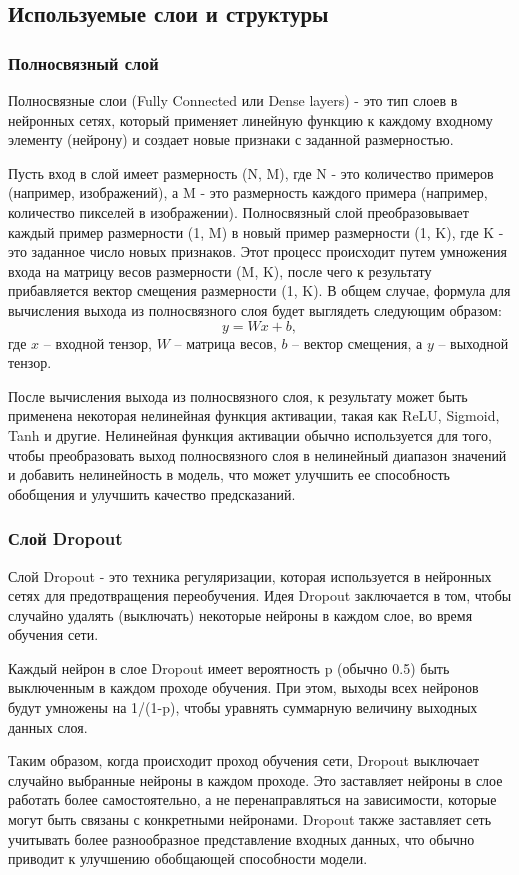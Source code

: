\documentclass[14pt,a4paper]{extarticle}
\begin{document}
\newpage
\subsection{Используемые слои и структуры}
\subsubsection*{Полносвязный слой}
Полносвязные слои (Fully Connected или Dense layers) - это тип слоев в нейронных сетях, который применяет линейную функцию к каждому входному элементу (нейрону) и создает новые признаки с заданной размерностью.

Пусть вход в слой имеет размерность (N, M), где N - это количество примеров (например, изображений), а M - это размерность каждого примера (например, количество пикселей в изображении). Полносвязный слой преобразовывает каждый пример размерности (1, M) в новый пример размерности (1, K), где K - это заданное число новых признаков. Этот процесс происходит путем умножения входа на матрицу весов размерности (M, K), после чего к результату прибавляется вектор смещения размерности (1, K). В общем случае, формула для вычисления выхода из полносвязного слоя будет выглядеть следующим образом:
$$y = Wx + b,$$
где $x$ -- входной тензор, $W$ -- матрица весов, $b$ -- вектор смещения, а $y$ -- вы\-ход\-ной тензор.

После вычисления выхода из полносвязного слоя, к результату может быть применена некоторая нелинейная функция активации, такая как ReLU, Sigmoid, Tanh и другие. Нелинейная функция активации обычно используется для того, чтобы преобразовать выход полносвязного слоя в нелинейный диапазон значений и добавить нелинейность в модель, что может улучшить ее способность обобщения и улучшить качество предсказаний.

\subsubsection*{Слой Dropout}
Слой Dropout - это техника регуляризации, которая используется в нейронных сетях для предотвращения переобучения. Идея Dropout заключается в том, чтобы случайно удалять (выключать) некоторые нейроны в каждом слое, во время обучения сети.

Каждый нейрон в слое Dropout имеет вероятность p (обычно 0.5) быть выключенным в каждом проходе обучения. При этом, выходы всех нейронов будут умножены на 1/(1-p), чтобы уравнять суммарную величину выходных данных слоя.

Таким образом, когда происходит проход обучения сети, Dropout выключает случайно выбранные нейроны в каждом проходе. Это заставляет нейроны в слое работать более самостоятельно, а не перенаправляться на зависимости, которые могут быть связаны с конкретными нейронами. Dropout также заставляет сеть учитывать более разнообразное представление входных данных, что обычно приводит к улучшению обобщающей способности модели.
\end{document}
